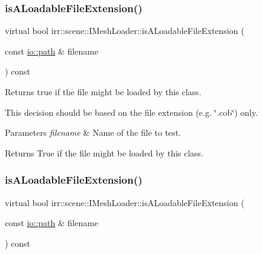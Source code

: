 \subsubsection{\texorpdfstring{is\+A\+Loadable\+File\+Extension()}{isALoadableFileExtension()}\hspace{0.1cm}{\footnotesize\ttfamily [1/2]}}
{\footnotesize\ttfamily virtual bool irr\+::scene\+::\+I\+Mesh\+Loader\+::is\+A\+Loadable\+File\+Extension (\begin{DoxyParamCaption}\item[{const \hyperlink{namespaceirr_1_1io_a6468281622ce3a1c46b72e19f32dded5}{io\+::path} \&}]{filename }\end{DoxyParamCaption}) const\hspace{0.3cm}{\ttfamily [pure virtual]}}



Returns true if the file might be loaded by this class. 

This decision should be based on the file extension (e.\+g. \char`\"{}.\+cob\char`\"{}) only. 
\begin{DoxyParams}{Parameters}
{\em filename} & Name of the file to test. \\
\hline
\end{DoxyParams}
\begin{DoxyReturn}{Returns}
True if the file might be loaded by this class. 
\end{DoxyReturn}
\mbox{\label{classirr_1_1scene_1_1IMeshLoader_a64bd3f1f17b4ff1f0f4f929c850614f3}} 
\subsubsection{\texorpdfstring{is\+A\+Loadable\+File\+Extension()}{isALoadableFileExtension()}\hspace{0.1cm}{\footnotesize\ttfamily [2/2]}}
{\footnotesize\ttfamily virtual bool irr\+::scene\+::\+I\+Mesh\+Loader\+::is\+A\+Loadable\+File\+Extension (\begin{DoxyParamCaption}\item[{const \hyperlink{namespaceirr_1_1io_a6468281622ce3a1c46b72e19f32dded5}{io\+::path} \&}]{filename }\end{DoxyParamCaption}) const\hspace{0.3cm}{\ttfamily [pure virtual]}}



